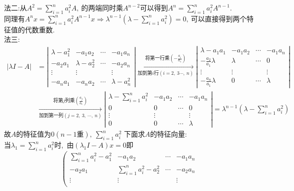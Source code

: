 \begin{solution}
	法二:从$A^2=\sum\limits_{i=1}^{n}a_i^2A,\ $的两端同时乘$A^{n-2}$可以得到$A^n=\sum\limits_{i=1}^{n}a_i^2A^{n-1}.$\\
	同理有$A^nx=\sum\limits_{i=1}^{n}a_i^2A^{n-1}x\Rightarrow\lambda^{n-1}(\lambda-\sum\limits_{i=1}^{n}a_i^2)=0,\ $可以直接得到两个特征值的代数重数.\\
	法三:
	$$\begin{aligned}
		|\lambda I-A|&=\left|\begin{matrix}
			\lambda-a_1^2  & -a_1a_2 & \cdots &-a_1a_n\\
			-a_2a_1 & \lambda-a_2^2  & \cdots &-a_2a_n\\
			\vdots & \vdots &        &\vdots\\
			-a_na_1 & -a_na_2 &\cdots  &\lambda-a_n^2
		\end{matrix}\right|\xrightarrow[\text{加到第}i\text{行}(i=2,\ 3\cdots,\ n)]{\text{将第一行乘}\left(-\frac{a_i}{a_1}\right)}\left|\begin{matrix}
			\lambda - a_1a_1 & -a_1a_2 & \cdots & -a_1a_n\\
			-\frac{a_2}{a_1}\lambda & \lambda  & \cdots & 0\\
			\vdots         & \vdots &  & \vdots\\
			-\frac{a_n}{a_1}\lambda & 0 & \cdots & \lambda
		\end{matrix}\right|\\
	&\xrightarrow[\text{加到第一列$(j=2,\ 3,\ \cdots,\ n)$}]{\text{将第$j$列乘$\left(\frac{a_j}{a_1}\right)$}}\left|\begin{matrix}
		\lambda - \sum\limits_{i=1}^{n}a_i^2 & -a_1a_2 & \cdots & -a_1a_n\\
		0 & 0  & \cdots & 0\\
		\vdots         & \vdots &  & \vdots\\
		0 & 0 & \cdots & \lambda
	\end{matrix}\right|=\lambda^{n-1}\left(\lambda-\sum\limits_{i=1}^{n}a_i^2\right)
	\end{aligned}$$
	故$A$的特征值为$0(n-1\text{重}),\ \sum\limits_{i=1}^{n}a_i^2$
	下面求$A$的特征向量:\\
	当$\lambda_1=\sum\limits_{i=1}^{n}a_i^2$时,\ 由$(\lambda_1I-A)x=0$即
	$$\left(\begin{matrix}
		\sum\limits_{i=1}^{n}a_i^2-a_1^2  & -a_1a_2 & \cdots &-a_1a_n\\
		-a_2a_1 & \sum\limits_{i=1}^{n}a_i^2-a_2^2  & \cdots &-a_2a_n\\
		\vdots & \vdots &        &\vdots\\

\end{matrix}$$
\end{solution}
